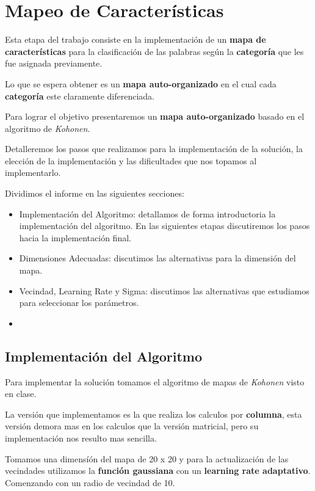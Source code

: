 
\section{Mapeo de Características}

Esta etapa del trabajo consiste en la implementación de un \textbf{mapa
de características} para la clasificación de las palabras según
la \textbf{categoría} que les fue asignada previamente.

Lo que se espera obtener es un \textbf{mapa auto-organizado} en el cual
cada \textbf{categoría} este claramente diferenciada.

Para lograr el objetivo presentaremos un \textbf{mapa auto-organizado} 
basado en el algoritmo de \emph{Kohonen}.

Detalleremos los pasos que realizamos para la implementación de la solución,
la elección de la implementación y las dificultades que nos topamos al
implementarlo.

Dividimos el informe en las siguientes secciones:

\begin{itemize}
\item Implementación del Algoritmo: detallamos de forma introductoria la
implementación del algoritmo. En las siguientes etapas discutiremos los pasos
hacia la implementación final.
\item Dimensiones Adecuadas: discutimos las alternativas para la dimensión
del mapa.
\item Vecindad, Learning Rate y Sigma: discutimos las alternativas que
estudiamos para seleccionar los parámetros.
\item 
\end{itemize}

\subsection{Implementación del Algoritmo}

Para implementar la solución tomamos el algoritmo de mapas
de \emph{Kohonen} visto en clase.

La versión que implementamos es la que realiza los calculos 
por \textbf{columna}, esta versión demora mas en los calculos 
que la versión matricial, pero su implementación nos resulto mas 
sencilla.

Tomamos una dimensíón del mapa de 20 x 20 y para la actualización 
de las vecindades utilizamos la \textbf{función gaussiana} con un 
\textbf{learning rate adaptativo}. Comenzando con un radio de 
vecindad de 10.

